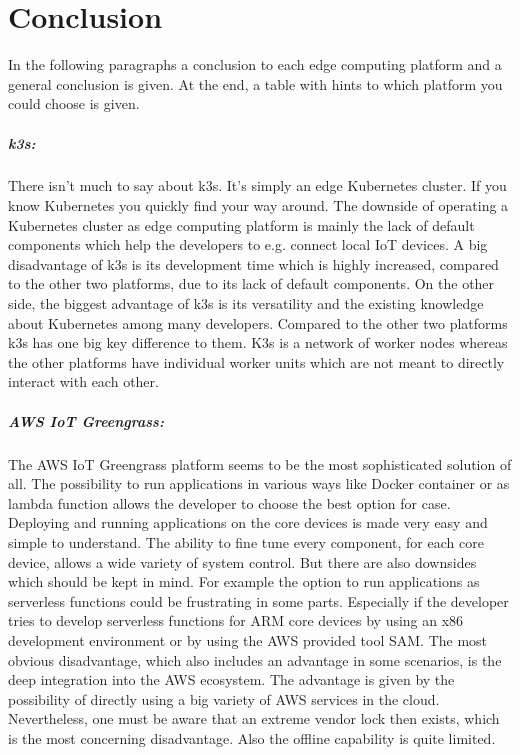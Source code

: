 \chapter{Conclusion}
In the following paragraphs a conclusion to each edge computing platform and a general conclusion is given. At the end, a table with hints to which platform you could choose is given.

\paragraph{k3s:} There isn't much to say about k3s. It's simply an edge Kubernetes cluster. If you know Kubernetes you quickly find your way around. The downside of operating a Kubernetes cluster as edge computing platform is mainly the lack of default components which help the developers to e.g. connect local IoT devices. A big disadvantage of k3s is its development time which is highly increased, compared to the other two platforms, due to its lack of default components. On the other side, the biggest advantage of k3s is its versatility and the existing knowledge about Kubernetes among many developers. Compared to the other two platforms k3s has one big key difference to them. K3s is a network of worker nodes whereas the other platforms have individual worker units which are not meant to directly interact with each other.

\paragraph{AWS IoT Greengrass:} The AWS IoT Greengrass platform seems to be the most sophisticated solution of all. The possibility to run applications in various ways like Docker container or as lambda function allows the developer to choose the best option for case. Deploying and running applications on the core devices is made very easy and simple to understand. The ability to fine tune every component, for each core device, allows a wide variety of system control. But there are also downsides which should be kept in mind. For example the option to run applications as serverless functions could be frustrating in some parts. Especially if the developer tries to develop serverless functions for ARM core devices by using an x86 development environment or by using the \gls{AWS} provided tool \gls{SAM}. The most obvious disadvantage, which also includes an advantage in some scenarios, is the deep integration into the \gls{AWS} ecosystem. The advantage is given by the possibility of directly using a big variety of \gls{AWS} services in the cloud. Nevertheless, one must be aware that an extreme vendor lock then exists, which is the most concerning disadvantage. Also the offline capability is quite limited.

